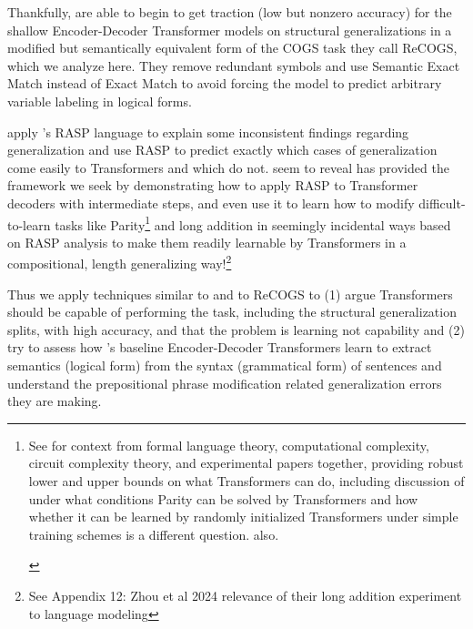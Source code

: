 \documentclass[11pt]{article}
\begin{document}
Thankfully, \cite{Wu2023} are able to begin to get traction (low but nonzero accuracy) for the shallow Encoder-Decoder Transformer models on structural generalizations in a modified but semantically equivalent form of the COGS task they call ReCOGS, which we analyze here. They remove redundant symbols and use Semantic Exact Match instead of Exact Match to avoid forcing the model to predict arbitrary variable labeling in logical forms.


\cite{Zhou2024} apply \cite{Weiss2021}'s RASP language to explain some inconsistent findings regarding generalization and use RASP to predict exactly which cases of generalization come easily to Transformers and which do not. \cite{Zhou2024} seem to reveal \cite{Weiss2021} has provided the framework we seek by demonstrating how to apply RASP to Transformer decoders with intermediate steps, and even use it to learn how to modify difficult-to-learn tasks like Parity\footnote{
\begin{tiny}
See \cite{Strobl2024} for context from formal language theory, computational complexity, circuit complexity theory, and experimental papers together, providing robust lower and upper bounds on what Transformers can do, including discussion of under what conditions Parity can be solved by Transformers and how whether it can be learned by randomly initialized Transformers under simple training schemes is a different question. \cite{delétang2023neuralnetworkschomskyhierarchy} also.
\end{tiny}} and long addition in seemingly incidental ways based on RASP analysis to make them readily learnable by Transformers in a compositional, length generalizing way!\footnote{See Appendix 12: Zhou et al 2024 relevance of their long addition experiment to language modeling}

Thus we apply techniques similar to \cite{Zhou2024} and \cite{Weiss2021} to ReCOGS to (1) argue Transformers should be capable of performing the task, including the structural generalization splits, with high accuracy, and that the problem is learning not capability and (2) try to assess how \cite{Wu2023}'s baseline Encoder-Decoder Transformers learn to extract semantics (logical form) from the syntax (grammatical form) of sentences and understand the prepositional phrase modification related generalization errors they are making.
\end{document}
